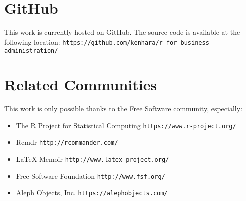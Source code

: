 %
%
%
%
%

\section{GitHub}
\setlength{\parindent}{0pt}
This work is currently hosted on GitHub. The source code is available at the following location: \texttt{https://github.com/kenhara/r-for-business-administration/}

\section{Related Communities}
This work is only possible thanks to the Free Software community, especially:

\begin{itemize}
 \item The R Project for Statistical Computing \texttt{https://www.r-project.org/}
 \item Rcmdr \texttt{http://rcommander.com/}
 \item {\LaTeX} Memoir \texttt{http://www.latex-project.org/}
 \item Free Software Foundation \texttt{http://www.fsf.org/}
 \item Aleph Objects, Inc. \texttt{https://alephobjects.com/}
\end{itemize}